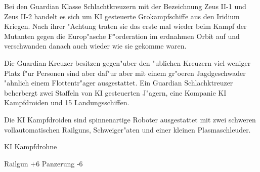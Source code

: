 
Bei den Guardian Klasse Schlachtkreuzern mit der Bezeichnung Zeus II-1 und Zeus II-2 handelt es sich um KI gesteuerte Gro\3kampfschiffe aus den Iridium Kriegen. Nach ihrer "Achtung traten sie das erste mal wieder beim Kampf der Mutanten gegen die Europ"asche F"orderation im erdnahmen Orbit auf und verschwanden danach auch wieder wie sie gekomme waren.

Die Guardian Kreuzer besitzen gegen"uber den "ublichen Kreuzern viel weniger Platz f"ur Personen sind aber daf"ur aber mit einem gr"o\3eren Jagdgeschwader "ahnlich einem Flottentr"ager ausgestattet. Ein Guardian Schlachktreuzer beherbergt zwei Staffeln von KI gesteuerten J"agern, eine Kompanie KI Kampfdroiden und 15 Landungsschiffen.

Die KI Kampfdroiden sind spinnenartige Roboter ausgestattet mit zwei schweren vollautomatischen Railguns, Schwei\3ger"aten und einer kleinen Plasmaschleuder.

\begin{nscsheet}[f]{KI Kampfdrohne}
    \nscstats[ATT=8,AGG=6,EMP=-,KNO=-,HP=15]
    \nscruler
    \begin{nscinventory}
        \nscitem[Waffen] Railgun +6
        \nscitem[R"ustung] Panzerung -6
    \end{nscinventory}
\end{nscsheet}

